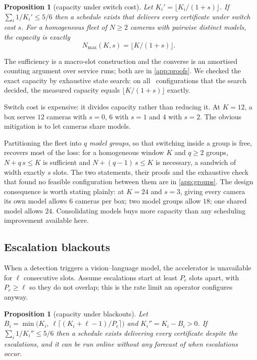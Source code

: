 \documentclass[preprint,review,12pt]{elsarticle}
\newtheorem{proposition}[theorem]{Proposition}
\theoremstyle{definition}
\newcommand{\Nc}{N}
\newcommand{\Ki}{K_i}
\begin{document}
\begin{proposition}[capacity under switch cost]\label{prop:switch}
Let $K_i'=\lfloor \Ki/(1+s)\rfloor$. If $\sum_i 1/K_i'\le 5/6$ then a schedule exists that delivers
every certificate under switch cost $s$. For a homogeneous fleet of $\Nc\ge2$ cameras with
pairwise distinct models, the capacity is exactly
\[
N_{\max}(K,s)=\big\lfloor K/(1+s)\big\rfloor .
\]
\end{proposition}

The sufficiency is a macro-slot construction and the converse is an amortised counting argument
over service runs; both are in \ref{app:proofs}. We checked the exact capacity by exhaustive state
search: on all \numCtwoClean\ configurations that the search decided, the measured capacity equals
$\lfloor K/(1+s)\rfloor$ exactly.

Switch cost is expensive: it divides capacity rather than reducing it. At $K=12$, a box serves
$12$ cameras with $s=0$, $6$ with $s=1$ and $4$ with $s=2$. The obvious mitigation is to let
cameras share models.

Partitioning the fleet into $q$ \emph{model groups}, so that switching inside a group is free,
recovers most of the loss: for a homogeneous window $K$ and $q\ge2$ groups, $\Nc+q\,s\le K$ is
sufficient and $\Nc+(q-1)\,s\le K$ is necessary, a sandwich of width exactly $s$ slots. The two
statements, their proofs and the exhaustive check that found no feasible configuration between
them are in \ref{app:groups}. The design consequence is worth stating plainly: at $K=24$ and
$s=3$, giving every camera its own model allows $6$ cameras per box; two model groups allow $18$;
one shared model allows $24$. Consolidating models buys more capacity than any scheduling
improvement available here.

\subsection{Escalation blackouts}\label{sec:blackout}
When a detection triggers a vision--language model, the accelerator is unavailable for $\ell$
consecutive slots. Assume escalations start at least $P_e$ slots apart, with $P_e\ge\ell$ so they
do not overlap; this is the rate limit an operator configures anyway.

\begin{proposition}[capacity under blackouts]\label{prop:blackout}
Let $B_i=\min\!\big(\Ki,\ \ell\lceil(\Ki+\ell-1)/P_e\rceil\big)$ and $K_i''=\Ki-B_i>0$. If
$\sum_i 1/K_i''\le5/6$ then a schedule exists delivering every certificate despite the escalations,
and it can be run online without any forecast of when escalations occur.
\end{proposition}
\end{document}
